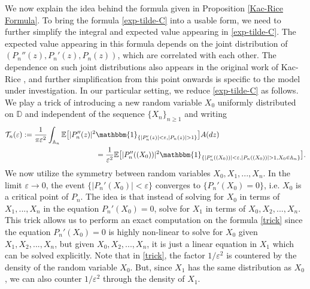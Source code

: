 \documentclass[9pt,a4paper,reqno]{amsart}
\theoremstyle{mine}
\theoremstyle{definition}
\theoremstyle{remark}
\renewcommand\epsilon{\varepsilon}
\newcommand{\mb}{\mathbb}
\begin{document}
We now explain the idea behind the formula given in Proposition \ref{Kac-Rice Formula}. To bring the formula \eqref{exp-tilde-C} into a usable form, we need to further simplify the integral and expected value appearing in \eqref{exp-tilde-C}. The expected value appearing in this formula depends on the joint distribution of $(P_n''(z), P_n'(z), P_n(z))$, which are correlated with each other. The dependence on such joint distributions also appears in the original work of Kac-Rice \cites{Rice-Mathematicalanalysisofrandomnoise, Kac-II}, and further simplification from this point onwards is specific to the model under investigation. In our particular setting, we reduce \eqref{exp-tilde-C} as follows. We play a trick of introducing a new random variable $X_0$ uniformly distributed on $\mb{D}$ and independent of the sequence $\{X_n\}_{n\geq 1}$ and writing 
\begin{align}\nonumber \label{trick}
    \mathcal{T}_n(\epsilon) := \frac{1}{\pi \epsilon^2 }\int_{\mb{A}_n} \mb{E}\bigl[|P_n''(z)|^2 &\mathbbm{1}_{\{|P_n'(z)|<\epsilon, |P_n(z)| >1\}}\bigr] A(dz) \\& = \frac{1}{\epsilon^2} \mb{E}\bigl[|P_n''((X_0))|^2 \mathbbm{1}_{\{|P_n'((X_0))|<\epsilon, |P_n((X_0))| >1, X_0 \in \mb{A}_n\}}\bigr].
\end{align}  
We now utilize the symmetry between random variables $X_0, X_1, ..., X_n$.  In the limit $\epsilon \to 0$, the event $\{|P_n'(X_0)| < \epsilon\}$ converges to $\{P_n'(X_0) =0\}$, i.e. $X_0$ is a critical point of $P_n$. The idea is that instead of solving for $X_0$ in terms of $X_1, ..., X_n$ in the equation $P_n'(X_0) =0$, solve for $X_1$ in terms of $X_0, X_2,...,X_n$. This trick allows us to perform an exact computation on the formula \eqref{trick} since the equation $P_n'(X_0) =0$ is highly non-linear to solve for $X_0$ given $X_1, X_2,..., X_n$, but given $X_0, X_2,...,X_n$, it is just a linear equation in $X_1$ which can be solved explicitly. Note that in \eqref{trick}, the factor $1/\epsilon^2$ is countered by the density of the random variable $X_0$. But, since $X_1$ has the same distribution as $X_0$, we can also counter $1/\epsilon^2$ through the density of $X_1$. \\
\end{document}

